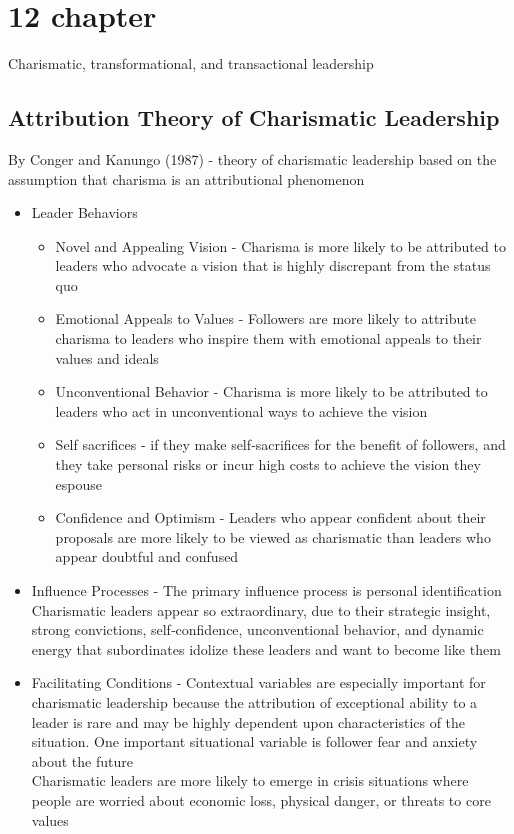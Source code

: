 

\section{12 chapter}
Charismatic, transformational, and transactional leadership

\subsection{Attribution Theory of Charismatic Leadership} %
\label{sub:attribution_theory_of_charismatic_leadership}
By Conger and Kanungo (1987) - theory of charismatic leadership based on the assumption that charisma is an attributional phenomenon
\begin{itemize}
	\item Leader Behaviors
	\begin{itemize}
		\item Novel and Appealing Vision - Charisma is more likely to be attributed to leaders who advocate a vision that is highly discrepant from the status quo
		\item Emotional Appeals to Values - Followers are more likely to attribute charisma to leaders who inspire them with emotional appeals to their values and ideals
		\item Unconventional Behavior - Charisma is more likely to be attributed to leaders who act in unconventional ways to achieve the vision
		\item Self sacrifices - if they make self‐sacrifices for the benefit of followers, and they take personal risks or incur high costs to achieve the vision they espouse
		\item Confidence and Optimism - Leaders who appear confident about their proposals are more likely to be viewed as charismatic than leaders who appear doubtful and confused
	\end{itemize}
	\item Influence Processes - The primary influence process is personal identification 
		\\Charismatic leaders appear so extraordinary, due to their strategic insight, strong convictions, self‐confidence, unconventional behavior, and dynamic energy that subordinates idolize these leaders and want to become like them
	\item Facilitating Conditions - Contextual variables are especially important for charismatic leadership because the attribution of exceptional ability to a leader is rare and may be highly dependent upon characteristics of the situation. One important situational variable is follower fear and anxiety about the future
		\\Charismatic leaders are more likely to emerge in crisis situations where people are worried about economic loss, physical danger, or threats to core values
\end{itemize}

